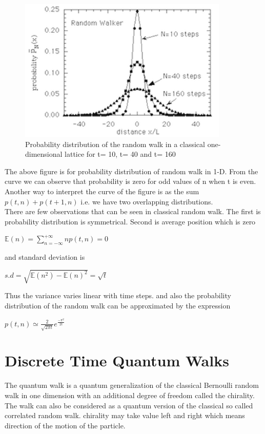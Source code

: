 \documentclass[11 pt]{article}
\theoremstyle{definition}
\theoremstyle{remark}
\begin{document}
\begin{figure}[htp]
\centering
\includegraphics[width=10cm]{Classical_Probability.png}
\caption{Probability distribution of the random walk in a classical one-dimensional lattice for t= 10, t= 40 and t= 160}
\end{figure}
The above figure is for probability distribution of random walk in 1-D. From the curve we can observe that probability is zero for odd values of n when t is even. Another way to interpret the curve of the figure is as the sum $p(t,n) + p(t+1,n) $ i.e. we have two overlapping distributions.\\

There are few observations that can be seen in classical random walk. The first is probability distribution is symmetrical. Second is average position which is zero \\
\begin{center}
    $\mathbb{E}(n) = \sum_{n=-\infty}^{+\infty} np(t,n) = 0$
\end{center}

and standard deviation is 
\begin{center}
    $s.d = \sqrt{\mathbb{E}(n^2) -{\mathbb{E}(n)}^2} = \sqrt{t}$
\end{center}
Thus the variance varies linear with time steps. and also the probability distribution of the random walk can be approximated by the expression
\begin{center}
    $ p(t,n) \simeq \frac{2}{\sqrt{2\pi t}} e^{\frac{-\pi^{2}}{2t}}$
\end{center}


\section{Discrete Time Quantum Walks}
The quantum walk is a quantum generalization of the classical Bernoulli random walk in one dimension with an additional degree of freedom called the chirality. The walk can also be considered as a quantum version of the classical so called correlated random walk. chirality may take value left and right which means direction of the motion of the particle.\\
\end{document}
